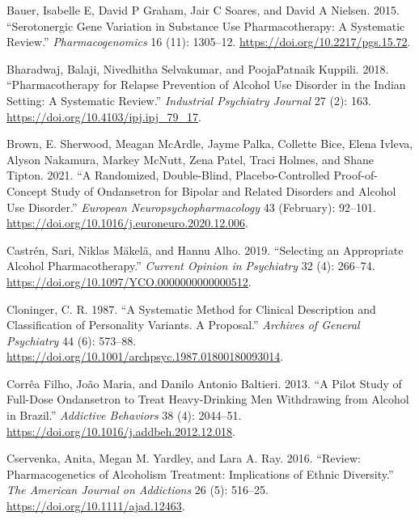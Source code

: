 \documentclass[
  12pt,
]{article}
\newlength{\cslhangindent}
\newenvironment{CSLReferences}[2] %
 {\begin{list}{}{%
  \setlength{\itemindent}{0pt}
  \setlength{\leftmargin}{0pt}
  \setlength{\parsep}{0pt}
  \ifodd #1
   \setlength{\leftmargin}{\cslhangindent}
   \setlength{\itemindent}{-1\cslhangindent}
  \fi
  \setlength{\itemsep}{#2\baselineskip}}}
 {\end{list}}
\begin{document}
\begin{CSLReferences}{1}{0}
Bauer, Isabelle E, David P Graham, Jair C Soares, and David A Nielsen.
2015. {``Serotonergic {Gene Variation} in {Substance Use
Pharmacotherapy}: {A Systematic Review}.''} \emph{Pharmacogenomics} 16
(11): 1305--12. \url{https://doi.org/10.2217/pgs.15.72}.

Bharadwaj, Balaji, Nivedhitha Selvakumar, and PoojaPatnaik Kuppili.
2018. {``Pharmacotherapy for Relapse Prevention of Alcohol Use Disorder
in the {Indian} Setting: {A} Systematic Review.''} \emph{Industrial
Psychiatry Journal} 27 (2): 163.
\url{https://doi.org/10.4103/ipj.ipj_79_17}.

Brown, E. Sherwood, Meagan McArdle, Jayme Palka, Collette Bice, Elena
Ivleva, Alyson Nakamura, Markey McNutt, Zena Patel, Traci Holmes, and
Shane Tipton. 2021. {``A Randomized, Double-Blind, Placebo-Controlled
Proof-of-Concept Study of Ondansetron for Bipolar and Related Disorders
and Alcohol Use Disorder.''} \emph{European Neuropsychopharmacology} 43
(February): 92--101.
\url{https://doi.org/10.1016/j.euroneuro.2020.12.006}.

Castrén, Sari, Niklas Mäkelä, and Hannu Alho. 2019. {``Selecting an
Appropriate Alcohol Pharmacotherapy.''} \emph{Current Opinion in
Psychiatry} 32 (4): 266--74.
\url{https://doi.org/10.1097/YCO.0000000000000512}.

Cloninger, C. R. 1987. {``A Systematic Method for Clinical Description
and Classification of Personality Variants. {A} Proposal.''}
\emph{Archives of General Psychiatry} 44 (6): 573--88.
\url{https://doi.org/10.1001/archpsyc.1987.01800180093014}.

Corrêa Filho, João Maria, and Danilo Antonio Baltieri. 2013. {``A Pilot
Study of Full-Dose Ondansetron to Treat Heavy-Drinking Men Withdrawing
from Alcohol in {Brazil}.''} \emph{Addictive Behaviors} 38 (4):
2044--51. \url{https://doi.org/10.1016/j.addbeh.2012.12.018}.

Cservenka, Anita, Megan M. Yardley, and Lara A. Ray. 2016. {``Review:
{Pharmacogenetics} of Alcoholism Treatment: {Implications} of Ethnic
Diversity.''} \emph{The American Journal on Addictions} 26 (5): 516--25.
\url{https://doi.org/10.1111/ajad.12463}.


\end{CSLReferences}
\end{document}
